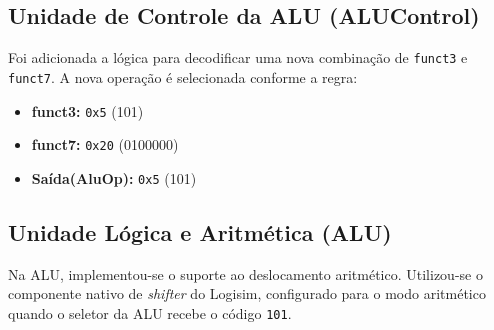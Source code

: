 \documentclass{article}
\begin{document}
\subsection{Unidade de Controle da ALU (ALUControl)}
Foi adicionada a lógica para decodificar uma nova combinação de \texttt{funct3} e \texttt{funct7}. A nova operação é selecionada conforme a regra:
\begin{itemize}
    \item \textbf{funct3:} \texttt{0x5} (101)
    \item \textbf{funct7:} \texttt{0x20} (0100000)
    \item \textbf{Saída(AluOp):} \texttt{0x5} (101)
\end{itemize}

\subsection{Unidade Lógica e Aritmética (ALU)}
Na ALU, implementou-se o suporte ao deslocamento aritmético. Utilizou-se o componente nativo de \textit{shifter} do Logisim, configurado para o modo aritmético quando o seletor da ALU recebe o código \texttt{101}.
\end{document}
